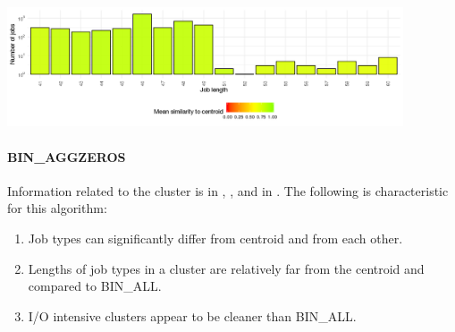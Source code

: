 \documentclass[]{llncs}
\begin{document}
  \label{tab:bin_all:top_jobs}
\endgroup
\begingroup
  \centering
  \includegraphics[width=4.61in,height=1.39in]{./media/image20.png}
  \label{fig:bin_all:length}
\endgroup
\paragraph{BIN\_AGGZEROS}
Information related to the cluster is in , , and in .
The following is characteristic for this algorithm:

\begin{enumerate}
 \item Job types can significantly differ from centroid and from each other.
 \item Lengths of job types in a cluster are relatively far from the centroid and compared to BIN\_ALL.
 \item I/O intensive clusters appear to be cleaner than BIN\_ALL.
\end{enumerate}
\end{document}
